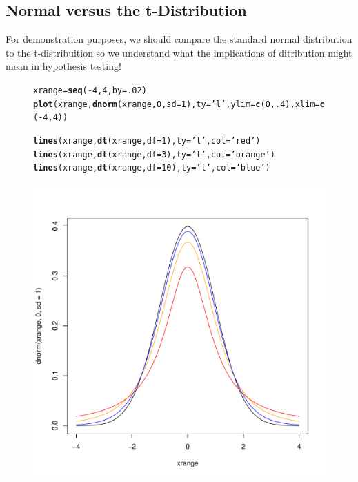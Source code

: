 \documentclass{tufte-handout}\usepackage[]{graphicx}\usepackage[]{color}
\makeatletter
\def\maxwidth{ %
  \ifdim\Gin@nat@width>\linewidth
    \linewidth
  \else
    \Gin@nat@width
  \fi
}
\newcommand{\hlnum}[1]{\textcolor[rgb]{0.686,0.059,0.569}{#1}}%
\newcommand{\hlstr}[1]{\textcolor[rgb]{0.192,0.494,0.8}{#1}}%
\newcommand{\hlopt}[1]{\textcolor[rgb]{0,0,0}{#1}}%
\newcommand{\hlstd}[1]{\textcolor[rgb]{0.345,0.345,0.345}{#1}}%
\newcommand{\hlkwb}[1]{\textcolor[rgb]{0.69,0.353,0.396}{#1}}%
\newcommand{\hlkwc}[1]{\textcolor[rgb]{0.333,0.667,0.333}{#1}}%
\newcommand{\hlkwd}[1]{\textcolor[rgb]{0.737,0.353,0.396}{\textbf{#1}}}%
\newenvironment{kframe}{%
 \def\at@end@of@kframe{}%
 \ifinner\ifhmode%
  \def\at@end@of@kframe{\end{minipage}}%
  \begin{minipage}{\columnwidth}%
 \fi\fi%
 \def\FrameCommand##1{\hskip\@totalleftmargin \hskip-\fboxsep
 \colorbox{shadecolor}{##1}\hskip-\fboxsep
     \hskip-\linewidth \hskip-\@totalleftmargin \hskip\columnwidth}%
 \MakeFramed {\advance\hsize-\width
   \@totalleftmargin\z@ \linewidth\hsize
   \@setminipage}}%
 {\par\unskip\endMakeFramed%
 \at@end@of@kframe}
\newenvironment{knitrout}{}{} %
\makeatother
\begin{document}
\subsection{Normal versus the t-Distribution}

For demonstration purposes, we should compare the standard normal distribution to the t-distribuition so we understand what the implications of ditribution might mean in hypothesis testing!

\begin{figure}
\begin{knitrout}
\color{fgcolor}\begin{kframe}
\begin{alltt}
\hlstd{xrange} \hlkwb{=} \hlkwd{seq}\hlstd{(}\hlopt{-}\hlnum{4}\hlstd{,} \hlnum{4}\hlstd{,} \hlkwc{by}\hlstd{=}\hlnum{.02}\hlstd{)}
\hlkwd{plot}\hlstd{(xrange,} \hlkwd{dnorm}\hlstd{(xrange,} \hlnum{0}\hlstd{,} \hlkwc{sd}\hlstd{=}\hlnum{1}\hlstd{),} \hlkwc{ty}\hlstd{=}\hlstr{'l'}\hlstd{,} \hlkwc{ylim}\hlstd{=}\hlkwd{c}\hlstd{(}\hlnum{0}\hlstd{,}\hlnum{.4}\hlstd{),} \hlkwc{xlim}\hlstd{=}\hlkwd{c}\hlstd{(}\hlopt{-}\hlnum{4}\hlstd{,}\hlnum{4}\hlstd{))}

\hlkwd{lines}\hlstd{(xrange,} \hlkwd{dt}\hlstd{(xrange,} \hlkwc{df}\hlstd{=}\hlnum{1}\hlstd{),} \hlkwc{ty}\hlstd{=}\hlstr{'l'}\hlstd{,} \hlkwc{col}\hlstd{=}\hlstr{'red'}\hlstd{)}
\hlkwd{lines}\hlstd{(xrange,} \hlkwd{dt}\hlstd{(xrange,} \hlkwc{df}\hlstd{=}\hlnum{3}\hlstd{),} \hlkwc{ty}\hlstd{=}\hlstr{'l'}\hlstd{,} \hlkwc{col}\hlstd{=}\hlstr{'orange'}\hlstd{)}
\hlkwd{lines}\hlstd{(xrange,} \hlkwd{dt}\hlstd{(xrange,} \hlkwc{df}\hlstd{=}\hlnum{10}\hlstd{),} \hlkwc{ty}\hlstd{=}\hlstr{'l'}\hlstd{,} \hlkwc{col}\hlstd{=}\hlstr{'blue'}\hlstd{)}
\end{alltt}
\end{kframe}
\includegraphics[width=\maxwidth]{figure/unnamed-chunk-22-1} 

\end{knitrout}
\end{figure}
\end{document}
